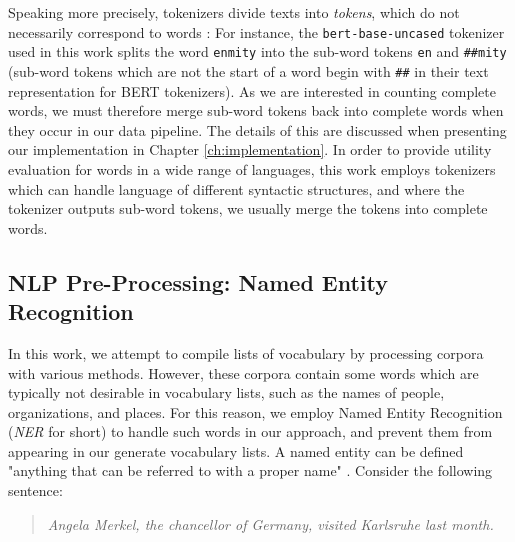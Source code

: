 Speaking more precisely, tokenizers divide texts into \textit{tokens}, which do not necessarily correspond to words \cite{jurafskySpeechLanguageProcessing2025}:
For instance, the \texttt{bert-base-uncased} tokenizer used in this work splits the word \texttt{enmity} into the sub-word tokens \texttt{en} and \texttt{\#\#mity} (sub-word tokens which are not the start of a word begin with \texttt{\#\#} in their text representation for BERT tokenizers).
As we are interested in counting complete words, we must therefore merge sub-word tokens back into complete words when they occur in our data pipeline.
The details of this are discussed when presenting our implementation in Chapter \ref{ch:implementation}.
In order to provide utility evaluation for words in a wide range of languages, this work employs tokenizers which can handle language of different syntactic structures, and where the tokenizer outputs sub-word tokens, we usually merge the tokens into complete words.

\subsection{NLP Pre-Processing: Named Entity Recognition}
In this work, we attempt to compile lists of vocabulary by processing corpora with various methods.
However, these corpora contain some words which are typically not desirable in vocabulary lists, such as the names of people, organizations, and places.
For this reason, we employ Named Entity Recognition \cite{jurafskySpeechLanguageProcessing2025} (\textit{NER} for short) to handle such words in our approach, and prevent them from appearing in our generate vocabulary lists.
A named entity can be defined "anything that can be referred to with a proper name" \cite{jurafskySpeechLanguageProcessing2025}.
Consider the following sentence:

\begin{quote}
	\textit{Angela Merkel, the chancellor of Germany, visited Karlsruhe last month.}
\end{quote}

